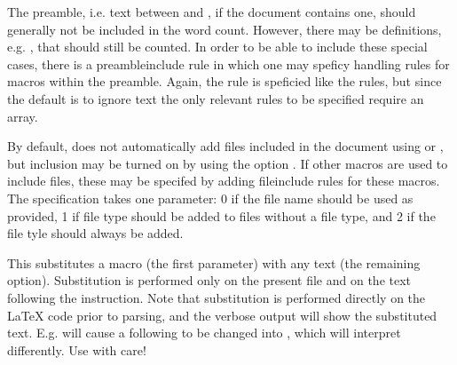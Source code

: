 \begin{description}
\option[preambleinclude]The preamble, i.e. text between  and , if the document contains one, should generally not be included in the word count. However, there may be definitions, e.g. , that should still be counted. In order to be able to include these special cases, there is a preambleinclude rule in which one may speficy handling rules for macros within the preamble. Again, the rule is speficied like the  rules, but since the default is to ignore text the only relevant rules to be specified require an array.

\option[fileinclude]By default, \TeXcount{} does not automatically add files included in the document using  or  , but inclusion may be turned on by using the option . If other macros are used to include files, these may be specifed by adding fileinclude rules for these macros. The specification takes one parameter: 0 if the file name should be used as provided, 1 if file type  should be added to files without a file type, and 2 if the file tyle  should always be added.

\option[subst]This substitutes a macro (the first parameter) with any text (the remaining option). Substitution is performed only on the present file and on the text following the instruction. Note that substitution is performed directly on the \LaTeX{} code prior to parsing, and the verbose output will show the substituted text. E.g.  will cause a following  to be changed into , which \TeXcount{} will interpret differently. Use with care!

\end{description}
